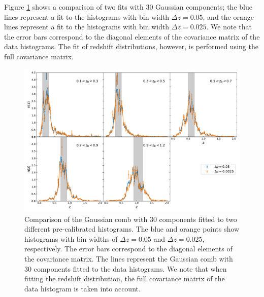 \documentclass{aa}
\begin{document}
\begin{appendix}
Figure \ref{fig:120vs240} shows a comparison of two fits with 30 Gaussian components; the blue lines represent a fit to the histograms with bin width $\Delta z = 0.05$, and the orange lines represent a fit to the histograms with bin width $\Delta z = 0.025$. We note that the error bars correspond to the diagonal elements of the covariance matrix of the data histograms. The fit of redshift distributions, however, is performed using the full covariance matrix.
\begin{figure}
\centering
\includegraphics[width=\linewidth]{calibration_bin_width.pdf}
\caption{Comparison of the Gaussian comb with 30 components fitted to two different pre-calibrated histograms. The blue and orange points show histograms with bin widths of $\Delta z = 0.05$ and $\Delta z = 0.025$, respectively. The error bars correspond to the diagonal elements of the covariance matrix. The lines represent the Gaussian comb with 30 components fitted to the data histograms. We note that when fitting the redshift distribution, the full covariance matrix of the data histogram is taken into account.}
\label{fig:120vs240}
\end{figure}


\end{appendix}
\end{document}
